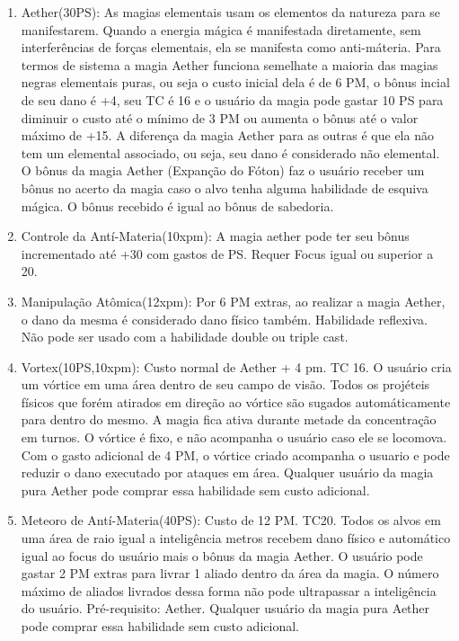   
\begin{enumerate}

		\item  Aether(30PS): As magias elementais usam os elementos da natureza para se manifestarem. Quando a energia mágica é manifestada diretamente, sem interferências de forças elementais, ela se manifesta como anti-máteria. Para termos de sistema a magia Aether funciona semelhate a maioria das magias negras elementais puras, ou seja o custo inicial dela é de 6 PM, o bônus incial de seu dano é +4, seu TC é 16 e o usuário da magia pode gastar 10 PS para diminuir o custo até o mínimo de 3 PM ou aumenta o bônus até o valor máximo de +15. A diferença da magia Aether para as outras é que ela não tem um elemental associado, ou seja, seu dano é considerado não elemental. O bônus da magia Aether (Expanção do Fóton) faz o usuário receber um bônus no acerto da magia caso o alvo tenha alguma habilidade de esquiva mágica. O bônus recebido é igual ao bônus de sabedoria.  

	 	\item Controle da Antí-Materia(10xpm): A magia aether pode ter seu bônus incrementado até +30 com gastos de PS. Requer Focus igual ou superior a 20.
		
		\item Manipulação Atômica(12xpm): Por 6 PM extras, ao realizar a magia Aether, o dano da mesma é considerado dano físico também. Habilidade reflexiva. Não pode ser usado com a habilidade double ou triple cast.	

   	
	 	\item Vortex(10PS,10xpm): Custo normal de Aether + 4 pm. TC 16.\newline
O usuário cria um vórtice em uma área dentro de seu campo de visão. Todos os projéteis físicos que forém atirados em direção ao vórtice são sugados automáticamente para dentro do mesmo. A magia fica ativa durante metade da concentração em turnos. O vórtice é fixo, e não acompanha o usuário caso ele se locomova. Com o gasto adicional de 4 PM, o vórtice criado acompanha o usuario e pode reduzir o dano executado por ataques em área. Qualquer usuário da magia pura Aether pode comprar essa habilidade sem custo adicional.

  	\item  Meteoro de Antí-Materia(40PS): Custo de 12 PM. TC20. \newline
Todos os alvos em uma área de raio igual a inteligência metros recebem dano físico e automático igual ao focus do usuário mais o bônus da magia Aether. O usuário pode gastar 2 PM extras para livrar 1 aliado dentro da área da magia. O número máximo de aliados livrados dessa forma não pode ultrapassar a inteligência do usuário. Pré-requisito: Aether. Qualquer usuário da magia pura Aether pode comprar essa habilidade sem custo adicional. 
	

\end{enumerate}
